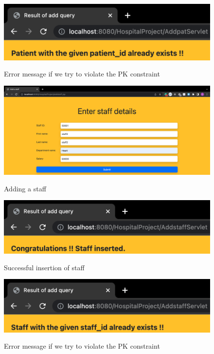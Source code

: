 \documentclass[12pt]{article}
\begin{document}
\begin{figure}[!hbt]
    \centering
    \includegraphics[scale=0.65]{screenshots/2k.png}
    \label{fig:data}
    \caption{Error message if we try to violate the PK constraint}
\end{figure}

\newpage

\begin{figure}[!hbt]
    \centering
    \includegraphics[scale=0.35]{screenshots/2l.png}
    \label{fig:my_label1}
    \caption{Adding a staff}
\end{figure}

\begin{figure}[!hbt]
    \centering
    \includegraphics[scale=0.85]{screenshots/2m.png}
    \label{fig:data}
    \caption{Successful insertion of staff}
\end{figure}

\begin{figure}[!hbt]
    \centering
    \includegraphics[scale=0.85]{screenshots/2n.png}
    \label{fig:my_label1}
    \caption{Error message if we try to violate the PK constraint}
\end{figure}
\end{document}
